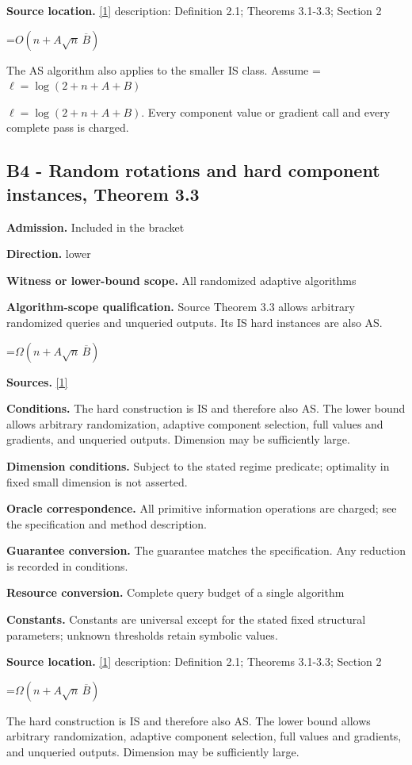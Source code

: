 \documentclass[10pt,a4paper]{article}
\newcommand{\AtlasMath}[1]{\par\begingroup\centering\setbox0=\hbox{$\displaystyle #1$}\ifdim\wd0>1.4\linewidth\typeout{ATLAS WIDE FORMULA: \the\wd0}\fi\ifdim\wd0>\linewidth\resizebox{\linewidth}{!}{\box0}\else\box0\fi\par\endgroup}
\newcommand{\AtlasInlineMath}[1]{\begingroup\setbox0=\hbox{$#1$}\ifdim\wd0>.4\linewidth\endgroup\AtlasMath{#1}\else\endgroup$#1$\fi}
\begin{document}
\textbf{Source location.} \href{https://arxiv.org/pdf/2610.16991v2}{[1]} description: Definition 2.1; Theorems 3.1-3.3; Section 2

\AtlasMath{O(n+A\sqrt n\,\overline B)}
The AS algorithm also applies to the smaller IS class. Assume \AtlasInlineMath{\ell=\log(2+n+A+B)}. Every component value or gradient call and every complete pass is charged.

\subsection{B4 - Random rotations and hard component instances, Theorem 3.3}
\textbf{Admission.} Included in the bracket

\textbf{Direction.} lower

\textbf{Witness or lower-bound scope.} All randomized adaptive algorithms

\textbf{Algorithm-scope qualification.} Source Theorem 3.3 allows arbitrary randomized queries and unqueried outputs. Its IS hard instances are also AS.

\AtlasMath{\Omega(n+A\sqrt n\,\overline B)}
\textbf{Sources.} \href{https://arxiv.org/pdf/2610.16991v2}{[1]}

\textbf{Conditions.} The hard construction is IS and therefore also AS. The lower bound allows arbitrary randomization, adaptive component selection, full values and gradients, and unqueried outputs. Dimension may be sufficiently large.

\textbf{Dimension conditions.} Subject to the stated regime predicate; optimality in fixed small dimension is not asserted.

\textbf{Oracle correspondence.} All primitive information operations are charged; see the specification and method description.

\textbf{Guarantee conversion.} The guarantee matches the specification. Any reduction is recorded in conditions.

\textbf{Resource conversion.} Complete query budget of a single algorithm

\textbf{Constants.} Constants are universal except for the stated fixed structural parameters; unknown thresholds retain symbolic values.

\textbf{Source location.} \href{https://arxiv.org/pdf/2610.16991v2}{[1]} description: Definition 2.1; Theorems 3.1-3.3; Section 2

\AtlasMath{\Omega(n+A\sqrt n\,\overline B)}
The hard construction is IS and therefore also AS. The lower bound allows arbitrary randomization, adaptive component selection, full values and gradients, and unqueried outputs. Dimension may be sufficiently large.
\end{document}
